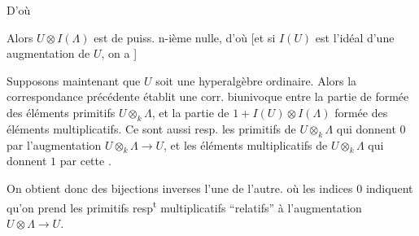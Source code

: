 

 D'où

Alors $U\otimes I(\Lambda)$ est de puiss. n-ième
nulle, d'où
[et si $I(U)$ est l'idéal d'une
augmentation de $U$, on a
]

Supposons maintenant que $U$ soit une
hyperalgèbre ordinaire. Alors la correspondance
précédente établit une corr. biunivoque
entre la partie de
formée
des éléments primitifs  $U\otimes_k\Lambda$, et
la partie de $1+I(U)\otimes I(\Lambda)$
formée des éléments multiplicatifs. Ce
sont aussi resp. les primitifs de
$U\otimes_k\Lambda$ qui donnent $0$ par l'augmentation
$U\otimes_k\Lambda\longrightarrow U$, et les éléments multiplicatifs de
$U\otimes_k\Lambda$ qui donnent $1$ par cette .



On obtient donc des bijections inverses l'une de l'autre.
où les indices $0$ indiquent qu'on
prend les primitifs resp\textsuperscript{t} multiplicatifs
``relatifs'' à l'augmentation $U\otimes\Lambda\longrightarrow U$.

